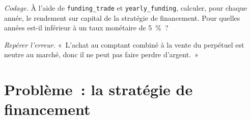 \begin{exercise}[$\star\star\star$]\label{exo:m3:perpetual-futures:7}
\emph{Codage.} À l'aide de \texttt{funding\_trade} et \texttt{yearly\_funding}, calculer, pour chaque année, le rendement sur
capital de la stratégie de financement. Pour quelles années est-il inférieur à un taux monétaire de 5~\%~?
\end{exercise}

\begin{exercise}[$\star\star\star$]\label{exo:m3:perpetual-futures:8}
\emph{Repérer l'erreur.} «~L'achat au comptant combiné à la vente du perpétuel est neutre au marché, donc il ne peut pas faire perdre d'argent.~»
\end{exercise}

\section{Problème~: la stratégie de financement}

